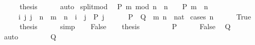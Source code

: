 \begin{isabellebody}
\ \ \isamarkupfalse%
\ \isamarkupfalse%
\ {\isacharquery}{\kern0pt}thesis\isanewline
\ \ \ \ \isamarkupfalse%
\ auto\isanewline
{}\isamarkupfalse%
%
\endisatagproof
{\isafoldproof}%
%
\isadelimproof
\isanewline
%
\endisadelimproof
\isanewline
{}\isamarkupfalse%
\ split{\isacharunderscore}{\kern0pt}mod{\isacharcolon}{\kern0pt}\isanewline
\ \ {\isachardoublequoteopen}P\ {\isacharparenleft}{\kern0pt}m\ mod\ n{\isacharparenright}{\kern0pt}\ {\isasymlongleftrightarrow}\ {\isacharparenleft}{\kern0pt}n\ {\isacharequal}{\kern0pt}\ {}\ {\isasymlongrightarrow}\ P\ m{\isacharparenright}{\kern0pt}\ {\isasymand}\ {\isacharparenleft}{\kern0pt}n\ {\isasymnoteq}\ {}\ {\isasymlongrightarrow}\isanewline
\ \ \ \ \ {\isacharparenleft}{\kern0pt}{\isasymforall}i\ j{\isachardot}{\kern0pt}\ j\ {\isacharless}{\kern0pt}\ n\ {\isasymlongrightarrow}\ m\ {\isacharequal}{\kern0pt}\ n\ {\isacharasterisk}{\kern0pt}\ i\ {\isacharplus}{\kern0pt}\ j\ {\isasymlongrightarrow}\ P\ j{\isacharparenright}{\kern0pt}{\isacharparenright}{\kern0pt}{\isachardoublequoteclose}\isanewline
\ \ \ \ \ {\isacharparenleft}{\kern0pt}\ {\isachardoublequoteopen}{\isacharquery}{\kern0pt}P\ {\isasymlongleftrightarrow}\ {\isacharquery}{\kern0pt}Q{\isachardoublequoteclose}{\isacharparenright}{\kern0pt}\ \ m\ n\ {\isacharcolon}{\kern0pt}{\isacharcolon}{\kern0pt}\ nat\isanewline
%
\isadelimproof
%
\endisadelimproof
%
\isatagproof
{}\isamarkupfalse%
\ {\isacharparenleft}{\kern0pt}cases\ {\isachardoublequoteopen}n\ {\isacharequal}{\kern0pt}\ {}{\isachardoublequoteclose}{\isacharparenright}{\kern0pt}\isanewline
\ \ \isamarkupfalse%
\ True\isanewline
\ \ \isamarkupfalse%
\ \isamarkupfalse%
\ {\isacharquery}{\kern0pt}thesis\isanewline
\ \ \ \ \isamarkupfalse%
\ simp\isanewline
{}\isamarkupfalse%
\isanewline
\ \ \isamarkupfalse%
\ False\isanewline
\ \ \isamarkupfalse%
\ {\isacharquery}{\kern0pt}thesis\isanewline
\ \ \isamarkupfalse%
\isanewline
\ \ \ \ \isamarkupfalse%
\ {\isacharquery}{\kern0pt}P\isanewline
\ \ \ \ \isamarkupfalse%
\ False\ \isamarkupfalse%
\ {\isacharquery}{\kern0pt}Q\isanewline
\ \ \ \ \ \ \isamarkupfalse%
\ auto\isanewline
\ \ \isamarkupfalse%
\isanewline
\ \ \ \ \isamarkupfalse%
\ {\isacharquery}{\kern0pt}Q\isanewline

\end{isabellebody}
